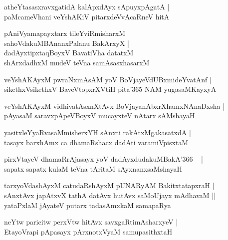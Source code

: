 \documentclass[twoside,12pt,openright]{book}
\newcounter{shloka}[chapter]
\begin{document}
\begin{shloka}%
atheYtasasxravxgatidA kalApxdAyx sApuyxpAgatA |\\
paMcameVhani veYshAKiV pitarxdeVvAcaRneV hitA 
\end{shloka}

\begin{shloka}%
pAniVyamapayxtarx tileYviRmisharxM \\
sahoVdakuMBAnanxPalanu BakArxyX |\\
dadAyxtipxtaqBoyxV BavatiVha datatxM \\
shArxdadhxM mudeV teVna samAsasxhasarxM 
\end{shloka}

\begin{shloka}%
veYshAKAyxM pwraNxmAsAM yoV BoVjayeVdUBxmideYvatAnf |\\
sikethxVsikethxV BaveVtopxrXVtiH pita\char'365 NAM yugasaMKayxyA 
\end{shloka}

\begin{shloka}%
veYshAKAyxM vidhivatAsxnXtAvx BoVjayanAbxrXhamxNAnaDxsha |\\
pAyasaM saravxpApeVBoyxV mucayxteV nAtarx sAMshayaH 
\end{shloka}

\begin{shloka}%
yasitxleYyaRvasaMmisherxYH  sAnxti rakAtxMgakasatxdA |\\
tasayx barxhAmx ca dhamaRshacx dadAti varamiVpisxtaM 
\end{shloka}

\begin{shloka}%
pirxVtayeV dhamaRrAjasayx yoV dadAyxdudakuMBakA\char'366 ~ |\\
sapatx sapatx kulaM teVna tAritaM sAyxnanxsaMshayaH 
\end{shloka}

\begin{shloka}%
tarxyoVdashAyxM catudaRshAyxM pUNARyAM BakitxtatapxraH |\\
sAnxtAvx japAtxvX tathA datAvx hutAvx saMoUjayx mAdhavaM ||\\
yataPxlaM jAyateV putarx tadasAmxkaM samapaRya 
\end{shloka}

\begin{shloka}%
neYtw paricitw perxVtw hitAvx savxgaRtimAsharxyeV |\\
EtayoVrapi pApasayx pArxnotxVyaM samupasithxtaH 
\end{shloka}
\end{document}
